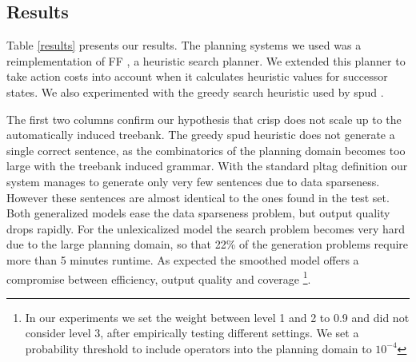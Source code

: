 


\subsection{Results}
Table \ref{results} presents our results.
The planning systems we used was a reimplementation of {\sc FF} \cite{hoffmannnebel2001}, a heuristic search planner. We extended this planner to take action costs into account when it calculates heuristic values for successor states. We also experimented with the greedy search heuristic used by {\sc spud} \cite{stonedoran1997}. 

The first two columns confirm our hypothesis that {\sc crisp} does not scale up to the automatically induced treebank. The greedy {\sc spud} heuristic does not generate a single correct sentence, as the combinatorics of the planning domain becomes too large with the treebank induced grammar. 
With the standard {\sc pltag} definition our system manages to generate only very few sentences due to data sparseness. However these sentences are almost identical to the ones found in the test set. Both generalized models ease the data sparseness problem, but output quality drops rapidly. For the unlexicalized model the search problem becomes very hard due to the large planning domain, so that 22\% of the generation problems require more than 5 minutes runtime. As expected the smoothed model offers a compromise between efficiency, output quality and coverage 
\footnote{In our experiments we set the weight between level 1 and 2 to 0.9 and did not consider level 3, after empirically testing different settings. We set a probability threshold to include operators into the planning domain to $10^{-4}$}.

